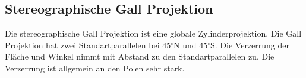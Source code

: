 \subsection{Stereographische Gall Projektion}
\label{sec:stereogall} 
Die stereographische Gall Projektion ist eine globale Zylinderprojektion. Die Gall Projektion hat zwei Standartparallelen bei 45$ ^\circ $N und 45$^\circ $S. Die Verzerrung der Fläche und Winkel nimmt mit Abstand zu den Standartparallelen zu. Die Verzerrung ist allgemein an den Polen sehr stark. 